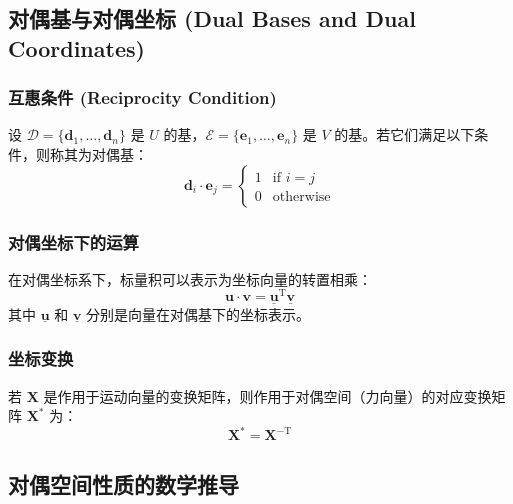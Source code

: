 \subsection{对偶基与对偶坐标 (Dual Bases and Dual Coordinates)}

\subsubsection{互惠条件 (Reciprocity Condition)}
设 $\mathcal{D} = \{\boldsymbol{d}_1, \dots, \boldsymbol{d}_n\}$ 是 $U$ 的基，$\mathcal{E} = \{\boldsymbol{e}_1, \dots, \boldsymbol{e}_n\}$ 是 $V$ 的基。若它们满足以下条件，则称其为对偶基：
\begin{equation}
\boldsymbol{d}_i \cdot \boldsymbol{e}_j = \begin{cases} 1 & \text{if } i=j \\ 0 & \text{otherwise} \end{cases}
\end{equation}

\subsubsection{对偶坐标下的运算}
在对偶坐标系下，标量积可以表示为坐标向量的转置相乘：
\begin{equation}
\boldsymbol{u} \cdot \boldsymbol{v} = \underline{\boldsymbol{u}}^{\text{T}} \underline{\boldsymbol{v}}
\end{equation}
其中 $\underline{\boldsymbol{u}}$ 和 $\underline{\boldsymbol{v}}$ 分别是向量在对偶基下的坐标表示。

\subsubsection{坐标变换}
若 $\mathbf{X}$ 是作用于运动向量的变换矩阵，则作用于对偶空间（力向量）的对应变换矩阵 $\mathbf{X}^*$ 为：
\begin{equation}
\mathbf{X}^* = \mathbf{X}^{-\text{T}}
\end{equation}
\subsection{对偶空间性质的数学推导}

